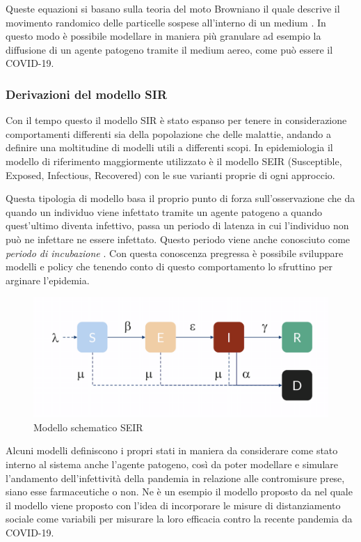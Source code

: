 Queste equazioni si basano sulla teoria del moto Browniano 
il quale descrive il movimento randomico delle particelle 
sospese all'interno di un medium \cite{wiki:Brownian_motion}. 
In questo modo è possibile modellare in maniera più granulare
ad esempio la diffusione di un agente patogeno tramite il 
medium aereo, come può essere il COVID-19.

\subsubsection{Derivazioni del modello SIR}

Con il tempo questo il modello SIR è stato espanso 
per tenere in considerazione comportamenti
differenti sia della popolazione che delle malattie, 
andando a definire una moltitudine di modelli utili a 
differenti scopi. In epidemiologia il modello di
riferimento maggiormente utilizzato è il modello SEIR 
(Susceptible, Exposed, Infectious, Recovered)
con le sue varianti proprie di ogni approccio.

Questa tipologia di modello basa il proprio punto di forza
sull'osservazione che da quando un individuo viene 
infettato tramite un agente patogeno a quando quest'ultimo 
diventa infettivo, passa un periodo di latenza in cui 
l'individuo non può ne infettare ne essere infettato. 
Questo periodo viene anche conosciuto come \emph{periodo di 
incubazione} \cite{wiki:Incubation_period}. Con questa 
conoscenza pregressa è possibile sviluppare modelli 
e policy che tenendo conto di questo comportamento lo 
sfruttino per arginare l'epidemia.

\begin{figure}[h]
    \includegraphics[width=\linewidth]{img/SEIR-compartmental-model-schematic.png}
    \caption{Modello schematico SEIR} 
    \label{fig:SEIR_model}
\end{figure}

Alcuni modelli definiscono i propri stati in maniera da considerare 
come stato interno al sistema anche l'agente patogeno, così da 
poter modellare e simulare l'andamento dell'infettività della pandemia 
in relazione alle contromisure prese, siano esse farmaceutiche o non.
Ne è un esempio il modello proposto da \cite{Mwalili2020} nel quale 
il modello viene proposto con l'idea di incorporare le misure di 
distanziamento sociale come variabili per misurare la loro efficacia
contro la recente pandemia da COVID-19.

